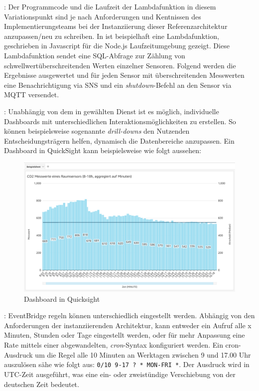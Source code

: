 
: Der Programmcode und die Laufzeit der Lambdafunktion in diesem Variationspunkt sind je nach Anforderungen und Kentnissen des Implementierungsteams bei der Instanziierung dieser Referenzarchitektur anzupassen/neu zu schreiben. In  ist beispielhaft eine Lambdafunktion, geschrieben in Javascript für die Node.js Laufzeitumgebung gezeigt. Diese Lambdafunktion sendet eine \ac{SQL}-Abfrage zur Zählung von schwellwertüberschreitenden Werten einzelner Sensoren. Folgend werden die Ergebnisse ausgewertet und für jeden Sensor mit überschreitenden Messwerten eine Benachrichtigung via SNS und ein \textit{shutdown}-Befehl an den Sensor via \ac{MQTT} versendet.

: Unabhängig von dem in  gewählten Dienst ist es möglich, individuelle Dashboards mit unterschiedlichen Interaktionsmöglichkeiten zu erstellen. So können beispielsweise sogenannte \textit{drill-downs} den Nutzenden Entscheidungsträgern helfen, dynamisch die Datenbereiche anzupassen. Ein Dashboard in QuickSight kann beispielsweise wie folgt aussehen:
\begin{figure}[H]
\centering
\includegraphics[width=\textwidth]{graphics/QuickSight-Beispiel.png}
\caption{Dashboard in Quicksight}
\label{abb:DashboardDBRA}
\end{figure}


: EventBridge regeln können unterschiedlich eingestellt werden. Abhängig von den Anforderungen der instanziierenden Architektur, kann entweder ein Aufruf alle x Minuten, Stunden oder Tage eingestellt werden, oder für mehr Anpassung eine Rate mittels einer abgewandelten, \textit{cron}-Syntax konfiguriert werden. Ein cron-Ausdruck um die Regel alle 10 Minuten an Werktagen zwischen 9 und 17.00 Uhr auszulösen sähe wie folgt aus: \texttt{0/10 9-17 ? * MON-FRI *}. Der Ausdruck wird in \ac{UTC}-Zeit ausgeführt, was eine ein- oder zweistündige Verschiebung von der deutschen Zeit bedeutet.

